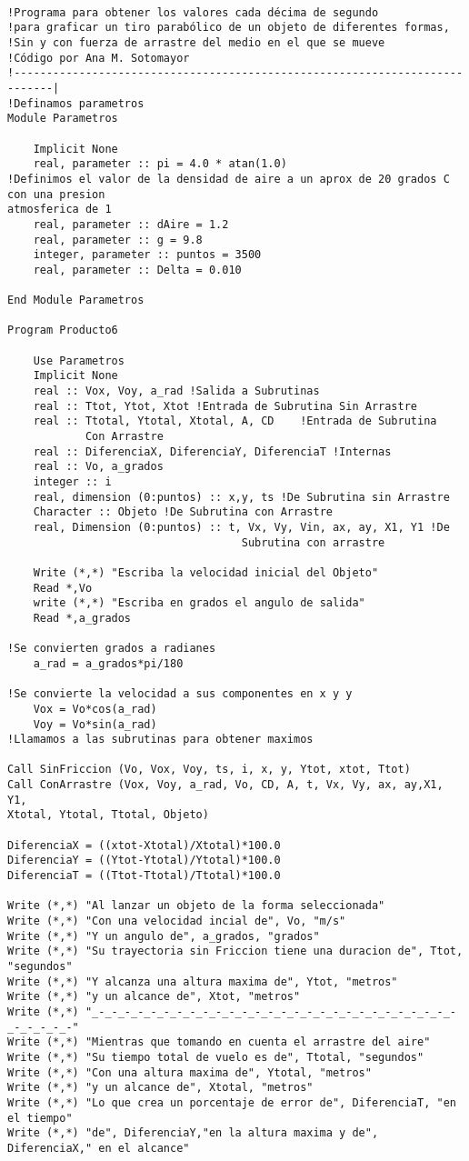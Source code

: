 \documentclass[letterpaper,10pt,twoside,onecolumn]{article}
\begin{document}
\begin{verbatim}

!Programa para obtener los valores cada décima de segundo
!para graficar un tiro parabólico de un objeto de diferentes formas,
!Sin y con fuerza de arrastre del medio en el que se mueve
!Código por Ana M. Sotomayor
!----------------------------------------------------------------------------|
!Definamos parametros
Module Parametros

    Implicit None
    real, parameter :: pi = 4.0 * atan(1.0)
!Definimos el valor de la densidad de aire a un aprox de 20 grados C con una presion
atmosferica de 1
    real, parameter :: dAire = 1.2
    real, parameter :: g = 9.8
    integer, parameter :: puntos = 3500
    real, parameter :: Delta = 0.010

End Module Parametros

Program Producto6

    Use Parametros
    Implicit None
    real :: Vox, Voy, a_rad !Salida a Subrutinas
    real :: Ttot, Ytot, Xtot !Entrada de Subrutina Sin Arrastre
    real :: Ttotal, Ytotal, Xtotal, A, CD    !Entrada de Subrutina 
    		Con Arrastre
    real :: DiferenciaX, DiferenciaY, DiferenciaT !Internas
    real :: Vo, a_grados
    integer :: i
    real, dimension (0:puntos) :: x,y, ts !De Subrutina sin Arrastre
    Character :: Objeto !De Subrutina con Arrastre
    real, Dimension (0:puntos) :: t, Vx, Vy, Vin, ax, ay, X1, Y1 !De 
								    Subrutina con arrastre

    Write (*,*) "Escriba la velocidad inicial del Objeto"
    Read *,Vo
    write (*,*) "Escriba en grados el angulo de salida"
    Read *,a_grados

!Se convierten grados a radianes
    a_rad = a_grados*pi/180

!Se convierte la velocidad a sus componentes en x y y
    Vox = Vo*cos(a_rad)
    Voy = Vo*sin(a_rad)
!Llamamos a las subrutinas para obtener maximos

Call SinFriccion (Vo, Vox, Voy, ts, i, x, y, Ytot, xtot, Ttot)
Call ConArrastre (Vox, Voy, a_rad, Vo, CD, A, t, Vx, Vy, ax, ay,X1, Y1, 
Xtotal, Ytotal, Ttotal, Objeto)

DiferenciaX = ((xtot-Xtotal)/Xtotal)*100.0
DiferenciaY = ((Ytot-Ytotal)/Ytotal)*100.0
DiferenciaT = ((Ttot-Ttotal)/Ttotal)*100.0

Write (*,*) "Al lanzar un objeto de la forma seleccionada"
Write (*,*) "Con una velocidad incial de", Vo, "m/s"
Write (*,*) "Y un angulo de", a_grados, "grados"
Write (*,*) "Su trayectoria sin Friccion tiene una duracion de", Ttot, "segundos"
Write (*,*) "Y alcanza una altura maxima de", Ytot, "metros"
Write (*,*) "y un alcance de", Xtot, "metros"
Write (*,*) "_-_-_-_-_-_-_-_-_-_-_-_-_-_-_-_-_-_-_-_-_-_-_-_-_-_-_-_-_-_-_-_-_-"
Write (*,*) "Mientras que tomando en cuenta el arrastre del aire"
Write (*,*) "Su tiempo total de vuelo es de", Ttotal, "segundos"
Write (*,*) "Con una altura maxima de", Ytotal, "metros"
Write (*,*) "y un alcance de", Xtotal, "metros"
Write (*,*) "Lo que crea un porcentaje de error de", DiferenciaT, "en el tiempo"
Write (*,*) "de", DiferenciaY,"en la altura maxima y de", DiferenciaX," en el alcance" 


\end{verbatim}
\end{document}
